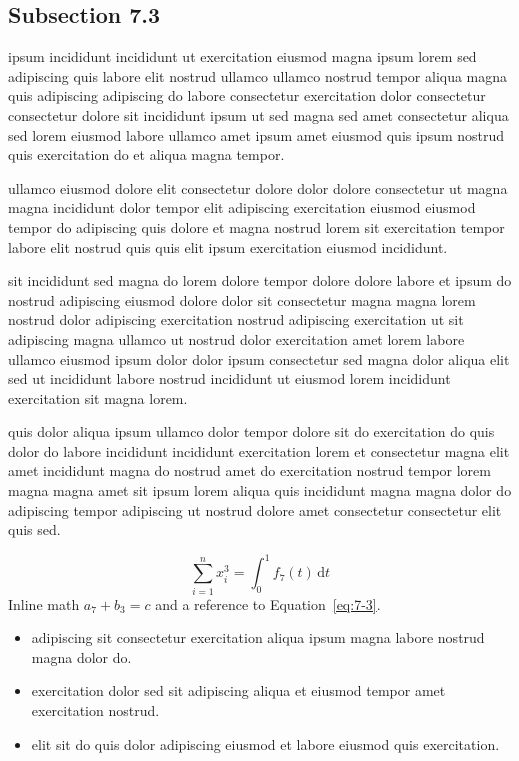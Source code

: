 \documentclass{article}
\begin{document}
\subsection{Subsection 7.3}\label{sec:7-3}
ipsum incididunt incididunt ut exercitation eiusmod magna ipsum lorem sed adipiscing quis labore elit nostrud ullamco ullamco nostrud tempor aliqua magna quis adipiscing adipiscing do labore consectetur exercitation dolor consectetur consectetur dolore sit incididunt ipsum ut sed magna sed amet consectetur aliqua sed lorem eiusmod labore ullamco amet ipsum amet eiusmod quis ipsum nostrud quis exercitation do et aliqua magna tempor.

ullamco eiusmod dolore elit consectetur dolore dolor dolore consectetur ut magna magna incididunt dolor tempor elit adipiscing exercitation eiusmod eiusmod tempor do adipiscing quis dolore et magna nostrud lorem sit exercitation tempor labore elit nostrud quis quis elit ipsum exercitation eiusmod incididunt.

sit incididunt sed magna do lorem dolore tempor dolore dolore labore et ipsum do nostrud adipiscing eiusmod dolore dolor sit consectetur magna magna lorem nostrud dolor adipiscing exercitation nostrud adipiscing exercitation ut sit adipiscing magna ullamco ut nostrud dolor exercitation amet lorem labore ullamco eiusmod ipsum dolor dolor ipsum consectetur sed magna dolor aliqua elit sed ut incididunt labore nostrud incididunt ut eiusmod lorem incididunt exercitation sit magna lorem.

quis dolor aliqua ipsum ullamco dolor tempor dolore sit do exercitation do quis dolor do labore incididunt incididunt exercitation lorem et consectetur magna elit amet incididunt magna do nostrud amet do exercitation nostrud tempor lorem magna magna amet sit ipsum lorem aliqua quis incididunt magna magna dolor do adipiscing tempor adipiscing ut nostrud dolore amet consectetur consectetur elit quis sed.

\begin{equation}\label{eq:7-3}
  \sum_{i=1}^{n} x_i^{3} = \int_0^1 f_{7}(t)\,\mathrm{d}t
\end{equation}
Inline math $a_{7} + b_{3} = c$ and a reference to Equation~\eqref{eq:7-3}.

\begin{itemize}
  \item adipiscing sit consectetur exercitation aliqua ipsum magna labore nostrud magna dolor do.
  \item exercitation dolor sed sit adipiscing aliqua et eiusmod tempor amet exercitation nostrud.
  \item elit sit do quis dolor adipiscing eiusmod et labore eiusmod quis exercitation.
\end{itemize}
\end{document}
